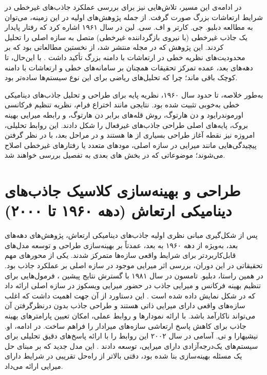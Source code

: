 در ادامه‌ی این مسیر، تلاش‌هایی نیز برای بررسی عملکرد جاذب‌های غیرخطی در شرایط ارتعاشات بزرگ صورت گرفت. از جمله پژوهش‌های اولیه در این زمینه، می‌توان به مطالعه دبلیو. جی. کارتر و اف. سی. لین در سال ۱۹۶۱ اشاره کرد که رفتار پایدار یک جاذب غیرخطی (با نیروی بازگرداننده غیرخطی) متصل به سازه اصلی را تحلیل کردند. این پژوهش که در مجله  منتشر شد، از نخستین مطالعاتی بود که بر محدودیت‌های نظریه خطی در ارتعاشات با دامنه بزرگ تأکید داشت  \cite{carter1961steady}. با این‌حال، تا دهه‌های بعد، عمده تمرکز تحقیقات همچنان بر سامانه‌های خطی و ارتعاشات با دامنه کوچک باقی ماند؛ چرا که تحلیل‌های ریاضی برای این نوع سیستم‌ها ساده‌تر بود.

به‌طور خلاصه، تا حدود سال ۱۹۶۰، نظریه پایه برای طراحی و تحلیل جاذب‌های دینامیکی خطی به‌خوبی تثبیت شده بود. نتایجی مانند اختراع فرام، نظریه تنظیم فرکانسی اورموندرایود و دن هارتوگ، روش قله‌های برابر دن هارتوگ، و رابطه میرایی بهینه بروک، پایه‌های اصلی طراحی جاذب‌های غیرفعال را شکل دادند. این روابط تحلیلی، امروزه نیز نقطه آغاز طراحی بسیاری از ‌ها هستند و در مراحل بعد، با در نظر گرفتن پیچیدگی‌هایی مانند میرایی در سازه اصلی، مودهای متعدد یا رفتارهای غیرخطی اصلاح می‌شوند؛ موضوعاتی که در بخش ‌های بعدی به تفصیل بررسی خواهند شد.


\section{طراحی و بهینه‌سازی کلاسیک جاذب‌های دینامیکی ارتعاش (دهه ۱۹۶۰ تا ۲۰۰۰)}

پس از شکل‌گیری مبانی نظری اولیه جاذب‌های دینامیکی ارتعاش، پژوهش‌های دهه‌های بعد، به‌ویژه از دهه ۱۹۶۰ به بعد، عمدتاً بر بهینه‌سازی طراحی و توسعه مدل‌های قابل‌کاربردتر برای شرایط واقعی سازه‌ها متمرکز شدند. یکی از محورهای مهم تحقیقاتی در این دوران، بررسی اثر میرایی موجود در سازه اصلی بر عملکرد جاذب بود. در همین راستا، دبلیو. تامسون در سال ۱۹۸۱ با گسترش نتایج پیشین ، فرمول‌هایی برای تنظیم بهینه فرکانس و میرایی جاذب در حضور میرایی ویسکوز در سازه اصلی ارائه داد که در شکل نمایش داده شده است \cite{thompson1981optimum}. این دستاورد از آن جهت اهمیت داشت که اغلب سازه‌های واقعی دارای میرایی ذاتی هستند و طراحی جاذب بدون درنظرگرفتن آن می‌تواند ناکارآمد باشد.  با ارائه نمودارها و روابط عملی، امکان تعیین پارامترهای بهینه جاذب برای کاهش پاسخ ارتعاشی سازه‌های میرادار را فراهم ساخت. در ادامه، او. نیشیهارا و تی. آسامی در سال ۲۰۰۲ این روابط را با ارائه پاسخ‌های دقیق تحلیلی برای سیستم‌های یک‌درجه‌آزادی دارای میرایی، توسعه دادند \cite{nishihara2002closed}. این مدل جدید که بر مبنای حل یک مسئله بهینه‌سازی  بنا شده بود، دقتی بالاتر از راه‌حل تقریبی  در شرایط دارای میرایی ارائه می‌داد.

